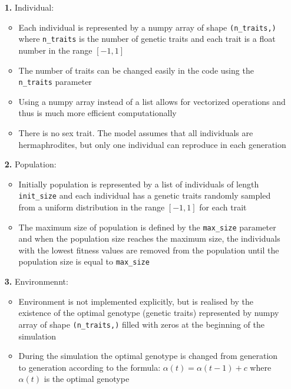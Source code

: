 \documentclass{article}
\begin{document}
\begin{itemize}
    \item[\textbf{1.}] Individual:
        \begin{itemize}
            \item Each individual is represented by a numpy array of shape \verb|(n_traits,)| where \verb|n_traits|
            is the number of genetic traits and each trait is a float number in the range $[-1, 1]$
            \item The number of traits can be changed easily in the code using the \verb|n_traits| parameter
            \item Using a numpy array instead of a list allows for vectorized operations and thus is much
            more efficient computationally
            \item There is no sex trait. The model assumes that all individuals are hermaphrodites, but only
            one individual can reproduce in each generation
        \end{itemize}
    \item[\textbf{2.}] Population:
        \begin{itemize}
            \item Initially population is represented by a list of individuals of length \verb|init_size|
            and each individual has a genetic traits randomly sampled from a uniform distribution 
            in the range $[-1, 1]$ for each trait
            \item The maximum size of population is defined by the \verb|max_size| parameter and 
            when the population size reaches the maximum size, the individuals with the lowest fitness
            values are removed from the population until the population size is equal to \verb|max_size|
        \end{itemize}
    \item[\textbf{3.}] Environmennt:
        \begin{itemize}
            \item Environment is not implemented explicitly, but is realised by the existence of the
            optimal genotype (genetic traits) represented by numpy array of shape \verb|(n_traits,)| filled
            with zeros at the beginning of the simulation 
            \item During the simulation the optimal genotype is changed from generation to generation 
            according to the formula: $\alpha(t)=\alpha(t-1)+c$ where $\alpha(t)$ is the optimal genotype

\end{itemize}
\end{itemize}
\end{document}
